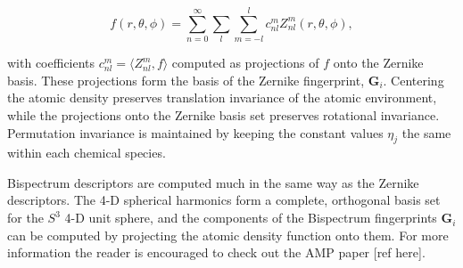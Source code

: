 \begin{equation}
 f(r, \theta, \phi) = \sum_{n=0}^{\infty} \sum_l \sum_{m=-l}^l
    c_{nl}^m Z_{nl}^m (r, \theta, \phi) , 
\end{equation}

with coefficients $c_{nl}^m = \langle Z_{nl}^m, f \rangle$
computed as projections of $f$ onto the Zernike basis.
These projections form the basis of the Zernike fingerprint,
$\bm{G}_i$. Centering the atomic density preserves translation
invariance of the atomic environment, while the projections
onto the Zernike basis set preserves rotational invariance.
Permutation invariance is maintained by keeping the constant values
$\eta_j$ the same within each chemical species.
\par
Bispectrum descriptors are computed much in the same way
as the Zernike descriptors. The 4-D spherical harmonics
form a complete, orthogonal basis set for the $S^3$ 4-D unit
sphere, and the components of the Bispectrum fingerprints
$\bm{G}_i$ can be computed by projecting the atomic
density function onto them. For more information
the reader is encouraged to check out the AMP paper [ref here].
